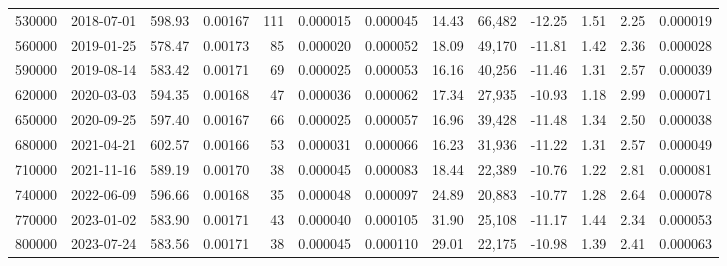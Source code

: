 \begin{tabular}{rlllrrrllllll}
\toprule
\midrule
530000 & 2018-07-01 & 598.93 & 0.00167 & 111 & 0.000015 & 0.000045 & 14.43 & 66,482 & -12.25 & 1.51 & 2.25 & 0.000019 \\
560000 & 2019-01-25 & 578.47 & 0.00173 & 85 & 0.000020 & 0.000052 & 18.09 & 49,170 & -11.81 & 1.42 & 2.36 & 0.000028 \\
590000 & 2019-08-14 & 583.42 & 0.00171 & 69 & 0.000025 & 0.000053 & 16.16 & 40,256 & -11.46 & 1.31 & 2.57 & 0.000039 \\
620000 & 2020-03-03 & 594.35 & 0.00168 & 47 & 0.000036 & 0.000062 & 17.34 & 27,935 & -10.93 & 1.18 & 2.99 & 0.000071 \\
650000 & 2020-09-25 & 597.40 & 0.00167 & 66 & 0.000025 & 0.000057 & 16.96 & 39,428 & -11.48 & 1.34 & 2.50 & 0.000038 \\
680000 & 2021-04-21 & 602.57 & 0.00166 & 53 & 0.000031 & 0.000066 & 16.23 & 31,936 & -11.22 & 1.31 & 2.57 & 0.000049 \\
710000 & 2021-11-16 & 589.19 & 0.00170 & 38 & 0.000045 & 0.000083 & 18.44 & 22,389 & -10.76 & 1.22 & 2.81 & 0.000081 \\
740000 & 2022-06-09 & 596.66 & 0.00168 & 35 & 0.000048 & 0.000097 & 24.89 & 20,883 & -10.77 & 1.28 & 2.64 & 0.000078 \\
770000 & 2023-01-02 & 583.90 & 0.00171 & 43 & 0.000040 & 0.000105 & 31.90 & 25,108 & -11.17 & 1.44 & 2.34 & 0.000053 \\
800000 & 2023-07-24 & 583.56 & 0.00171 & 38 & 0.000045 & 0.000110 & 29.01 & 22,175 & -10.98 & 1.39 & 2.41 & 0.000063 \\
\bottomrule
\end{tabular}
